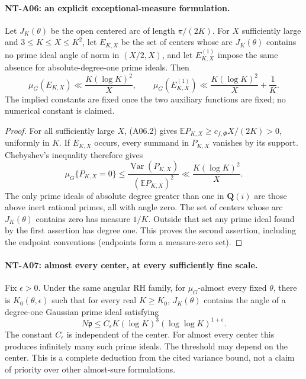 \paragraph{NT-A06: an explicit exceptional-measure formulation.}
Let \(J_K(\theta)\) be the open centered arc of length \(\pi/(2K)\).
For \(X\) sufficiently large and \(3\le K\le X\le K^2\),
let \(E_{K,X}\) be the set of centers whose arc \(J_K(\theta)\)
contains no prime ideal angle of norm in \((X/2,X)\), and let
\(E^{(1)}_{K,X}\) impose the same absence for absolute-degree-one
prime ideals. Then
\[
 \mu_G(E_{K,X})\ll\frac{K(\log K)^2}{X},\qquad
 \mu_G(E^{(1)}_{K,X})\ll\frac{K(\log K)^2}{X}+\frac1K .
                                                               \tag{A06.3}
\]
The implied constants are fixed once the two auxiliary functions
are fixed; no numerical constant is claimed.

\begin{proof}
For all sufficiently large \(X\), (A06.2) gives
\(\mathbb E P_{K,X}\ge c_{f,\Phi}X/(2K)>0\), uniformly in \(K\).
If \(E_{K,X}\) occurs, every summand in \(P_{K,X}\)
vanishes by its support. Chebyshev's inequality therefore gives
\[
 \mu_G\{P_{K,X}=0\}
 \le \frac{\operatorname{Var}(P_{K,X})}
           {(\mathbb E P_{K,X})^2}
 \ll \frac{K(\log K)^2}{X}.
 \]
The only prime ideals of absolute degree greater than one in
\(\mathbf Q(i)\) are those above inert rational primes, all with
angle zero. The set of centers whose arc \(J_K(\theta)\) contains
zero has measure \(1/K\). Outside that set any prime ideal found
by the first assertion has degree one. This proves the second
assertion, including the endpoint conventions (endpoints form a
measure-zero set).
\end{proof}

\paragraph{NT-A07: almost every center, at every sufficiently fine scale.}
Fix \(\epsilon>0\). Under the same angular RH family, for
\(\mu_G\)-almost every fixed \(\theta\), there is
\(K_0(\theta,\epsilon)\) such that for every real \(K\ge K_0\),
\(J_K(\theta)\) contains the angle of a degree-one Gaussian prime
ideal satisfying
\[
 N\mathfrak p\le C_\epsilon
              K(\log K)^3(\log\log K)^{1+\epsilon}.       \tag{A07.1}
\]
The constant \(C_\epsilon\) is independent of the center.
For almost every center this produces infinitely many such prime
ideals. The threshold may depend on the center. This is a
complete deduction from the cited variance bound, not a claim
of priority over other almost-sure formulations.

